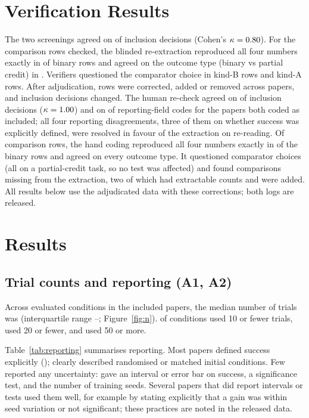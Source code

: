 \documentclass[11pt]{article}
\begin{document}
\section{Verification Results}\label{sec:verify}
The two screenings agreed on \VerIncAgree{} of \VerScreened{} inclusion decisions (Cohen's $\kappa=0.80$). For the \VerRows{} comparison rows checked, the blinded re-extraction reproduced all four numbers exactly in \VerExactPct{} of binary rows and agreed on the outcome type (binary vs partial credit) in \VerOutcomePct{}. Verifiers questioned the comparator choice in \VerBFlag{} kind-B rows and \VerAFlag{} kind-A rows. After adjudication, \VerCorrectedRows{} rows were corrected, added or removed across \VerCorrectedPapers{} papers, and \VerInclChanged{} inclusion decisions changed. The human re-check agreed on \HumScrAgree{} of \HumScrPapers{} inclusion decisions ($\kappa=1.00$) and on \HumRepCellsAgree{} of \HumRepCells{} reporting-field codes for the \HumScrBoth{} papers both coded as included; all four reporting disagreements, three of them on whether success was explicitly defined, were resolved in favour of the extraction on re-reading. Of \HumRows{} comparison rows, the hand coding reproduced all four numbers exactly in \HumExactPct{} of the \HumBinaryRows{} binary rows and agreed on every outcome type. It questioned \HumCompFlag{} comparator choices (all on a partial-credit task, so no test was affected) and found \HumAdded{} comparisons missing from the extraction, two of which had extractable counts and were added. All results below use the adjudicated data with these corrections; both logs are released.

\section{Results}\label{sec:results}

\subsection{Trial counts and reporting (A1, A2)}
Across \AuditConditions{} evaluated conditions in the \AuditIncluded{} included papers, the median number of trials was \AuditMedianN{} (interquartile range \AuditNQOne--\AuditNQThree; Figure~\ref{fig:n}). \AuditShareNLeTen{} of conditions used 10 or fewer trials, \AuditShareNLeTwenty{} used 20 or fewer, and \AuditShareNGeFifty{} used 50 or more.

Table~\ref{tab:reporting} summarises reporting. Most papers defined success explicitly (\AuditRepSuccessDef{}); \AuditRepRandInit{} clearly described randomised or matched initial conditions. Few reported any uncertainty: \AuditRepCI{} gave an interval or error bar on success, \AuditRepTest{} a significance test, and \AuditRepSeeds{} the number of training seeds. Several papers that did report intervals or tests used them well, for example by stating explicitly that a gain was within seed variation or not significant; these practices are noted in the released data.
\end{document}
